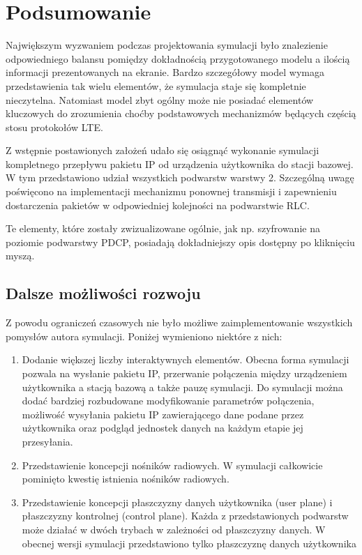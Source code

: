 \chapter{Podsumowanie}
\label{cha:podsumowanie}

Największym wyzwaniem podczas projektowania symulacji było znalezienie odpowiedniego balansu pomiędzy dokładnością przygotowanego modelu a ilością informacji prezentowanych na ekranie. Bardzo szczegółowy model wymaga przedstawienia tak wielu elementów, że symulacja staje się kompletnie nieczytelna. Natomiast model zbyt ogólny może nie posiadać elementów kluczowych do zrozumienia choćby podstawowych mechanizmów będących częścią stosu protokołów LTE.

Z wstępnie postawionych założeń udało się osiągnąć wykonanie symulacji kompletnego przepływu pakietu IP od urządzenia użytkownika do stacji bazowej. W tym przedstawiono udział wszystkich podwarstw warstwy 2. Szczególną uwagę poświęcono na implementacji mechanizmu ponownej transmisji i zapewnieniu dostarczenia pakietów w odpowiedniej kolejności na podwarstwie RLC.

Te elementy, które zostały zwizualizowane ogólnie, jak np. szyfrowanie na poziomie podwarstwy PDCP, posiadają dokładniejszy opis dostępny po kliknięciu myszą.

\section{Dalsze możliwości rozwoju}

Z powodu ograniczeń czasowych nie było możliwe zaimplementowanie wszystkich pomysłów autora symulacji. Poniżej wymieniono niektóre z nich:

\begin{enumerate}
	\item Dodanie większej liczby interaktywnych elementów. Obecna forma symulacji pozwala na wysłanie pakietu IP, przerwanie połączenia między urządzeniem użytkownika a stacją bazową a także pauzę symulacji. Do symulacji można dodać bardziej rozbudowane modyfikowanie parametrów połączenia, możliwość wysyłania pakietu IP zawierającego dane podane przez użytkownika oraz podgląd jednostek danych na każdym etapie jej przesyłania.
	\item Przedstawienie koncepcji nośników radiowych. W symulacji całkowicie pominięto kwestię istnienia nośników radiowych.
	\item Przedstawienie koncepcji płaszczyzny danych użytkownika (user plane) i płaszczyzny kontrolnej (control plane). Każda z przedstawionych podwarstw może działać w dwóch trybach w zależności od płaszczyzny danych. W obecnej wersji symulacji przedstawiono tylko płaszczyznę danych użytkownika
\end{enumerate}

